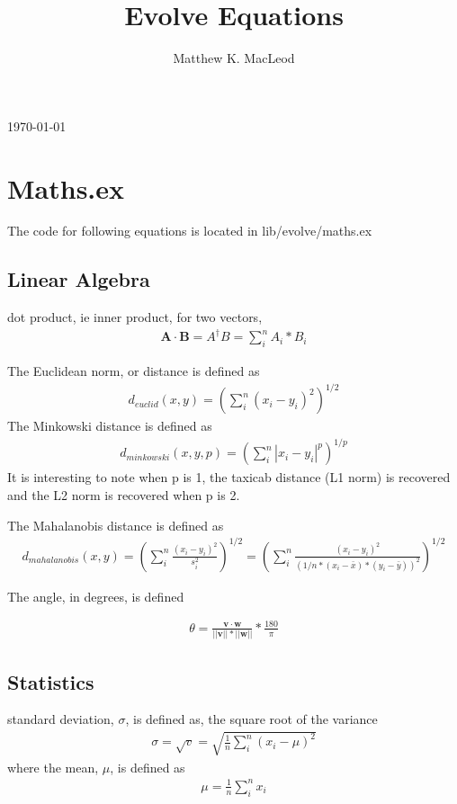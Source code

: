 \documentclass[jcp,aip,amsmath]{revtex4-1}
\begin{document}
\title{Evolve Equations}
\author{Matthew K. MacLeod}
\maketitle
\today

\section{Maths.ex}
The code for following equations is located in lib/evolve/maths.ex

\subsection{Linear Algebra}
dot product, ie inner product, for two vectors,
\begin{align}
\mathbf{A} \cdot \mathbf{B} = A^\dag B = \sum_i^n A_i * B_i
\end{align}

The Euclidean norm, or distance is defined as
\begin{align}
d_{euclid} (x,y) = \left( \sum_i^n (x_i - y_i)^2 \right)^{1/2}
\end{align}
The Minkowski distance is defined as
\begin{align}
d_{minkowski} (x,y,p) = \left( \sum_i^n |x_i - y_i|^{p} \right)^{1/p}
\end{align}
It is interesting to note when p is 1, the taxicab distance (L1 norm) is recovered and
the L2 norm is recovered when p is 2.

The Mahalanobis distance is defined as
\begin{align}
d_{mahalanobis} (x,y) = \left( \sum_i^n \frac{(x_i - y_i)^2}{s^2_i} \right)^{1/2} = \left( \sum_i^n \frac{(x_i - y_i)^2}{ \left(1/n *(x_i - \bar{x})*(y_i-\bar{y})\right)^2} \right)^{1/2}
\end{align}

The angle, in degrees, is defined

\begin{align}
\theta = \frac{\mathbf{v} \cdot \mathbf{w}}{||\mathbf{v}||*||\mathbf{w}||} * \frac{180}{\pi}
\end{align}

\subsection{Statistics}

standard deviation, $\sigma$, is defined as, the square root of the variance
\begin{align}
\sigma = \sqrt{v} =  \sqrt{\frac{1}{n}\sum_i^n (x_i - \mu)^2}
\end{align}
where the mean, $\mu$, is defined as
\begin{align}
\mu = \frac{1}{n} \sum_i^n x_i
\end{align}
\end{document}
